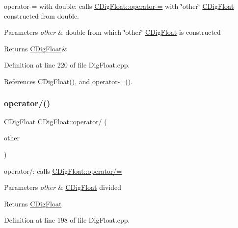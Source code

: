 operator-\/= with double\+: calls \hyperlink{classCDigFloat_a7496a4f8445815e9a346076c3d90305a}{C\+Dig\+Float\+::operator-\/=} with \char`\"{}other\char`\"{} \hyperlink{classCDigFloat}{C\+Dig\+Float} constructed from double. 


\begin{DoxyParams}{Parameters}
{\em other} & double from which \char`\"{}other\char`\"{} \hyperlink{classCDigFloat}{C\+Dig\+Float} is constructed \\
\hline
\end{DoxyParams}
\begin{DoxyReturn}{Returns}
\hyperlink{classCDigFloat}{C\+Dig\+Float}\& 
\end{DoxyReturn}


Definition at line 220 of file Dig\+Float.\+cpp.



References C\+Dig\+Float(), and operator-\/=().

\mbox{\label{classCDigFloat_a238db4ab96c398e3d2387641743d6a16}} 
\subsubsection{\texorpdfstring{operator/()}{operator/()}\hspace{0.1cm}{\footnotesize\ttfamily [1/2]}}
{\footnotesize\ttfamily \hyperlink{classCDigFloat}{C\+Dig\+Float} C\+Dig\+Float\+::operator/ (\begin{DoxyParamCaption}\item[{const \hyperlink{classCDigFloat}{C\+Dig\+Float} \&}]{other }\end{DoxyParamCaption})}



operator/\+: calls \hyperlink{classCDigFloat_a53d3939dfc89d172f1bf803a46bc3369}{C\+Dig\+Float\+::operator/=} 


\begin{DoxyParams}{Parameters}
{\em other} & \hyperlink{classCDigFloat}{C\+Dig\+Float} divided \\
\hline
\end{DoxyParams}
\begin{DoxyReturn}{Returns}
\hyperlink{classCDigFloat}{C\+Dig\+Float} 
\end{DoxyReturn}


Definition at line 198 of file Dig\+Float.\+cpp.

